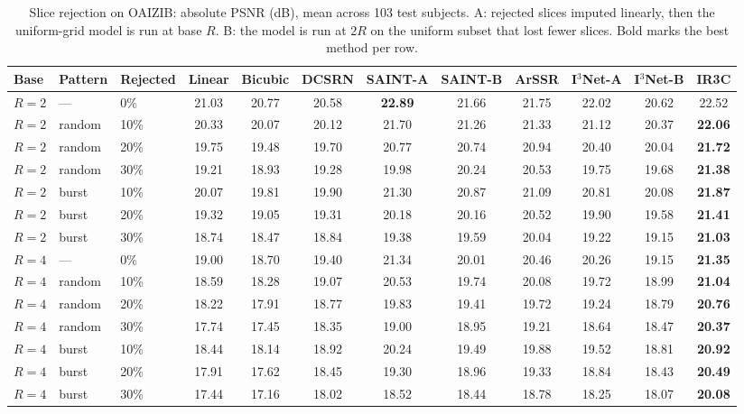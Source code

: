 \begin{table}[pos=!htbp]
\caption{Slice rejection on OAIZIB: absolute PSNR (dB), mean across 103 test subjects. A: rejected slices imputed linearly, then the uniform-grid model is run at base $R$. B: the model is run at $2R$ on the uniform subset that lost fewer slices. Bold marks the best method per row.}
\label{tab:reject-abs-oaizib}
\footnotesize
\begin{tabular*}{\textwidth}{@{\extracolsep{\fill}}lllccccccccc@{}}
\toprule
Base & Pattern & Rejected & Linear & Bicubic & DCSRN & SAINT-A & SAINT-B & ArSSR & I$^3$Net-A & I$^3$Net-B & IR3C \\
\midrule
$R=2$ & --- & 0\% & 21.03 & 20.77 & 20.58 & \textbf{22.89} & 21.66 & 21.75 & 22.02 & 20.62 & 22.52 \\
$R=2$ & random & 10\% & 20.33 & 20.07 & 20.12 & 21.70 & 21.26 & 21.33 & 21.12 & 20.37 & \textbf{22.06} \\
$R=2$ & random & 20\% & 19.75 & 19.48 & 19.70 & 20.77 & 20.74 & 20.94 & 20.40 & 20.04 & \textbf{21.72} \\
$R=2$ & random & 30\% & 19.21 & 18.93 & 19.28 & 19.98 & 20.24 & 20.53 & 19.75 & 19.68 & \textbf{21.38} \\
$R=2$ & burst & 10\% & 20.07 & 19.81 & 19.90 & 21.30 & 20.87 & 21.09 & 20.81 & 20.08 & \textbf{21.87} \\
$R=2$ & burst & 20\% & 19.32 & 19.05 & 19.31 & 20.18 & 20.16 & 20.52 & 19.90 & 19.58 & \textbf{21.41} \\
$R=2$ & burst & 30\% & 18.74 & 18.47 & 18.84 & 19.38 & 19.59 & 20.04 & 19.22 & 19.15 & \textbf{21.03} \\
$R=4$ & --- & 0\% & 19.00 & 18.70 & 19.40 & 21.34 & 20.01 & 20.46 & 20.26 & 19.15 & \textbf{21.35} \\
$R=4$ & random & 10\% & 18.59 & 18.28 & 19.07 & 20.53 & 19.74 & 20.08 & 19.72 & 18.99 & \textbf{21.04} \\
$R=4$ & random & 20\% & 18.22 & 17.91 & 18.77 & 19.83 & 19.41 & 19.72 & 19.24 & 18.79 & \textbf{20.76} \\
$R=4$ & random & 30\% & 17.74 & 17.45 & 18.35 & 19.00 & 18.95 & 19.21 & 18.64 & 18.47 & \textbf{20.37} \\
$R=4$ & burst & 10\% & 18.44 & 18.14 & 18.92 & 20.24 & 19.49 & 19.88 & 19.52 & 18.81 & \textbf{20.92} \\
$R=4$ & burst & 20\% & 17.91 & 17.62 & 18.45 & 19.30 & 18.96 & 19.33 & 18.84 & 18.43 & \textbf{20.49} \\
$R=4$ & burst & 30\% & 17.44 & 17.16 & 18.02 & 18.52 & 18.44 & 18.78 & 18.25 & 18.07 & \textbf{20.08} \\
\bottomrule
\end{tabular*}
\end{table}

